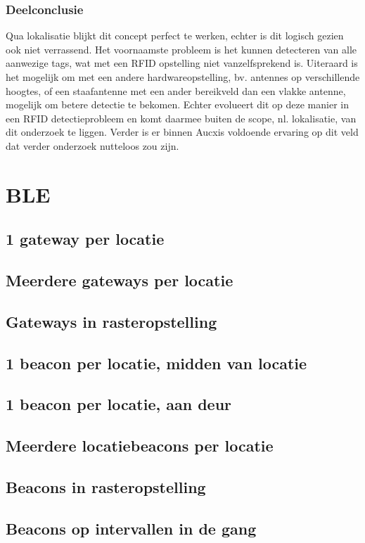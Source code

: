 \subsubsection{Deelconclusie}
Qua lokalisatie blijkt dit concept perfect te werken, echter is dit logisch gezien ook niet verrassend. Het voornaamste probleem is het kunnen detecteren van alle aanwezige tags, wat met een RFID opstelling niet vanzelfsprekend is. Uiteraard is het mogelijk om met een andere hardwareopstelling, bv. antennes op verschillende hoogtes, of een staafantenne met een ander bereikveld dan een vlakke antenne, mogelijk om betere detectie te bekomen. Echter evolueert dit op deze manier in een RFID detectieprobleem en komt daarmee buiten de scope, nl. lokalisatie, van dit onderzoek te liggen. Verder is er binnen Aucxis voldoende ervaring op dit veld dat verder onderzoek nutteloos zou zijn.

\section{BLE}

\subsection{1 gateway per locatie}

\subsection{Meerdere gateways per locatie}

\subsection{Gateways in rasteropstelling}

\subsection{1 beacon per locatie, midden van locatie}

\subsection{1 beacon per locatie, aan deur}

\subsection{Meerdere locatiebeacons per locatie}

\subsection{Beacons in rasteropstelling}

\subsection{Beacons op intervallen in de gang}
